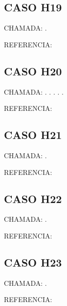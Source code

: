 \documentclass{undftex}
\begin{document}
\begin{refsection}\section*{CASO H19} CHAMADA: . \textcite{H01a}\par REFERENCIA:\par\printbibliography[heading=none]\end{refsection}\clearpage
\begin{refsection}\section*{CASO H20} CHAMADA: . \textcite{H20a}. . . . \par REFERENCIA:\par\printbibliography[heading=none,check=undfconsultadas]\end{refsection}\clearpage
\begin{refsection}\section*{CASO H21} CHAMADA: . \textcite{H21a}\par REFERENCIA:\par\printbibliography[heading=none,check=undfconsultadas]\end{refsection}\clearpage
\begin{refsection}\section*{CASO H22} CHAMADA: . \textcite{H22a}\par REFERENCIA:\par\printbibliography[heading=none,check=undfconsultadas]\end{refsection}\clearpage
\begin{refsection}\section*{CASO H23} CHAMADA: . \textcite{H23a}\par REFERENCIA:\par\printbibliography[heading=none,check=undfconsultadas]\end{refsection}\clearpage
\end{document}
